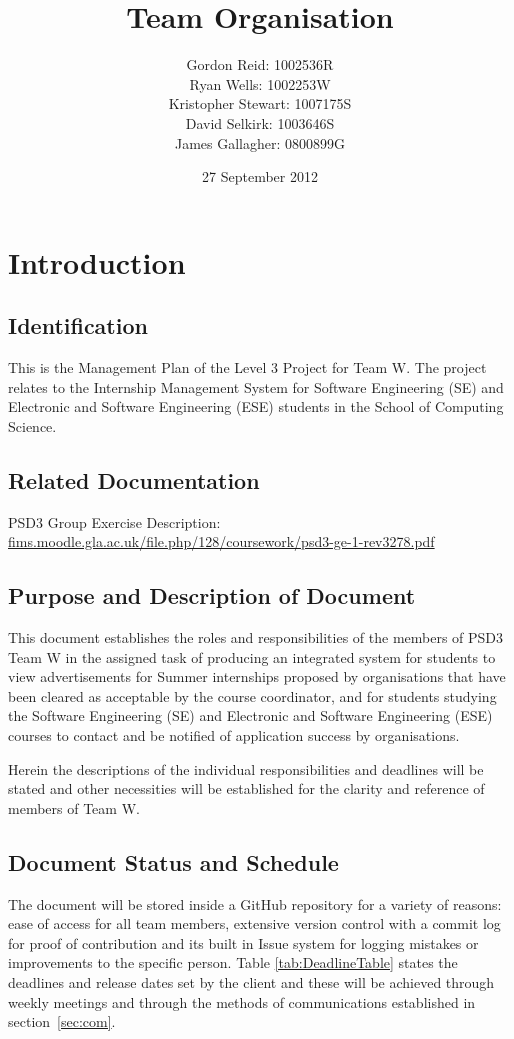 \documentclass{l3deliverable}
\title{Team Organisation}
\author{
    Gordon Reid: 1002536R\\
    Ryan Wells: 1002253W\\
    Kristopher Stewart: 1007175S\\
    David Selkirk: 1003646S\\
    James Gallagher: 0800899G\\
}
\date{27 September 2012}
\begin{document}
\maketitle

\section{Introduction}

\subsection{Identification}
This is the Management Plan of the Level 3 Project for Team W.  The project 
relates to the Internship Management System for Software Engineering (SE) and 
Electronic and Software Engineering (ESE) students in the School of Computing 
Science.

\subsection{Related Documentation}
PSD3 Group Exercise Description:\\
\url{fims.moodle.gla.ac.uk/file.php/128/coursework/psd3-ge-1-rev3278.pdf}

\subsection{Purpose and Description of Document}

This document establishes the roles and responsibilities of the members of 
PSD3 Team W in the assigned task of producing an integrated system for 
students to view advertisements for Summer internships proposed by 
organisations that have been cleared as acceptable by the course coordinator, 
and for students studying the Software Engineering (SE) and Electronic and
Software Engineering (ESE) courses to contact and be notified of application 
success by organisations.

Herein the descriptions of the individual responsibilities and deadlines will 
be stated and other necessities will be established for the clarity and 
reference of members of Team W.

\subsection{Document Status and Schedule}

The document will be stored inside a GitHub repository for a variety of reasons:
ease of access for all team members, extensive version control with a commit log
for proof of contribution and its built in Issue system for logging mistakes or 
improvements to the specific person. Table \ref{tab:DeadlineTable} states the 
deadlines and release dates set by the client and these will be achieved 
through weekly meetings and through the methods of communications established 
in section~\ref{sec:com}.
\end{document}
